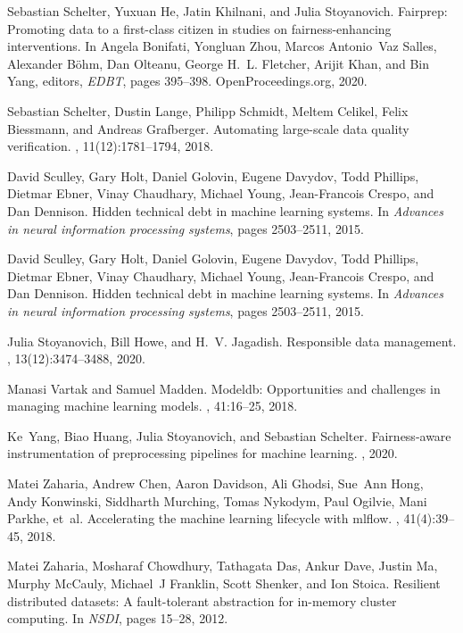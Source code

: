 \documentclass[11pt]{article}
\begin{document}
\begin{thebibliography}{10}
Sebastian Schelter, Yuxuan He, Jatin Khilnani, and Julia Stoyanovich.
\newblock Fairprep: Promoting data to a first-class citizen in studies on
  fairness-enhancing interventions.
\newblock In Angela Bonifati, Yongluan Zhou, Marcos Antonio~Vaz Salles,
  Alexander B{\"{o}}hm, Dan Olteanu, George H.~L. Fletcher, Arijit Khan, and
  Bin Yang, editors, {\em EDBT}, pages 395--398. OpenProceedings.org, 2020.

Sebastian Schelter, Dustin Lange, Philipp Schmidt, Meltem Celikel, Felix
  Biessmann, and Andreas Grafberger.
\newblock Automating large-scale data quality verification.
, 11(12):1781--1794, 2018.

David Sculley, Gary Holt, Daniel Golovin, Eugene Davydov, Todd Phillips,
  Dietmar Ebner, Vinay Chaudhary, Michael Young, Jean-Francois Crespo, and Dan
  Dennison.
\newblock Hidden technical debt in machine learning systems.
\newblock In {\em Advances in neural information processing systems}, pages
  2503--2511, 2015.

David Sculley, Gary Holt, Daniel Golovin, Eugene Davydov, Todd Phillips,
  Dietmar Ebner, Vinay Chaudhary, Michael Young, Jean-Francois Crespo, and Dan
  Dennison.
\newblock Hidden technical debt in machine learning systems.
\newblock In {\em Advances in neural information processing systems}, pages
  2503--2511, 2015.

Julia Stoyanovich, Bill Howe, and H.~V. Jagadish.
\newblock Responsible data management.
, 13(12):3474--3488, 2020.

Manasi Vartak and Samuel Madden.
\newblock Modeldb: Opportunities and challenges in managing machine learning
  models.
, 41:16--25, 2018.

Ke~Yang, Biao Huang, Julia Stoyanovich, and Sebastian Schelter.
\newblock Fairness-aware instrumentation of preprocessing pipelines for machine
  learning.
, 2020.

Matei Zaharia, Andrew Chen, Aaron Davidson, Ali Ghodsi, Sue~Ann Hong, Andy
  Konwinski, Siddharth Murching, Tomas Nykodym, Paul Ogilvie, Mani Parkhe,
  et~al.
\newblock Accelerating the machine learning lifecycle with mlflow.
, 41(4):39--45, 2018.

Matei Zaharia, Mosharaf Chowdhury, Tathagata Das, Ankur Dave, Justin Ma, Murphy
  McCauly, Michael~J Franklin, Scott Shenker, and Ion Stoica.
\newblock Resilient distributed datasets: A fault-tolerant abstraction for
  in-memory cluster computing.
\newblock In {\em NSDI}, pages 15--28, 2012.

\end{thebibliography}
\end{document}

